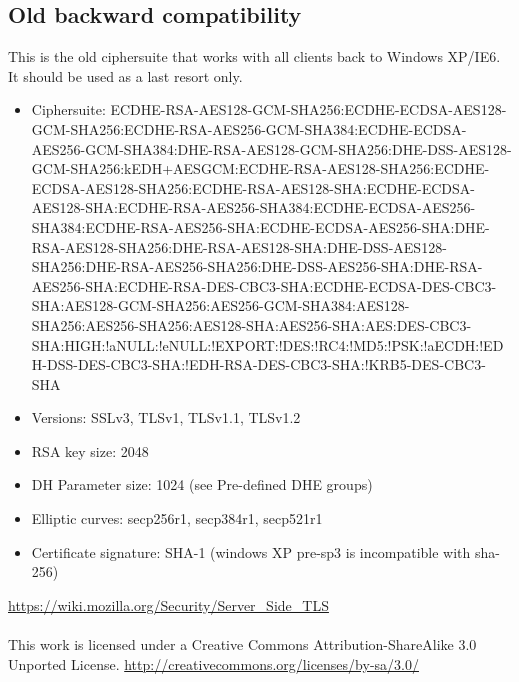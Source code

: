 \subsection{Old backward compatibility}
This is the old ciphersuite that works with all clients back to Windows XP/IE6. It should be used as a last resort only.
\begin{itemize}
\item Ciphersuite: ECDHE-RSA-AES128-GCM-SHA256:ECDHE-ECDSA-AES128-GCM-SHA256:ECDHE-RSA-AES256-GCM-SHA384:ECDHE-ECDSA-AES256-GCM-SHA384:DHE-RSA-AES128-GCM-SHA256:DHE-DSS-AES128-GCM-SHA256:kEDH+AESGCM:ECDHE-RSA-AES128-SHA256:ECDHE-ECDSA-AES128-SHA256:ECDHE-RSA-AES128-SHA:ECDHE-ECDSA-AES128-SHA:ECDHE-RSA-AES256-SHA384:ECDHE-ECDSA-AES256-SHA384:ECDHE-RSA-AES256-SHA:ECDHE-ECDSA-AES256-SHA:DHE-RSA-AES128-SHA256:DHE-RSA-AES128-SHA:DHE-DSS-AES128-SHA256:DHE-RSA-AES256-SHA256:DHE-DSS-AES256-SHA:DHE-RSA-AES256-SHA:ECDHE-RSA-DES-CBC3-SHA:ECDHE-ECDSA-DES-CBC3-SHA:AES128-GCM-SHA256:AES256-GCM-SHA384:AES128-SHA256:AES256-SHA256:AES128-SHA:AES256-SHA:AES:DES-CBC3-SHA:HIGH:!aNULL:!eNULL:!EXPORT:!DES:!RC4:!MD5:!PSK:!aECDH:!EDH-DSS-DES-CBC3-SHA:!EDH-RSA-DES-CBC3-SHA:!KRB5-DES-CBC3-SHA
\item Versions: SSLv3, TLSv1, TLSv1.1, TLSv1.2
\item RSA key size: 2048
\item DH Parameter size: 1024 (see Pre-defined DHE groups)
\item Elliptic curves: secp256r1, secp384r1, secp521r1
\item Certificate signature: SHA-1 (windows XP pre-sp3 is incompatible with sha-256)
\end{itemize}
\url{https://wiki.mozilla.org/Security/Server_Side_TLS}\\\\This work is licensed under a Creative Commons Attribution-ShareAlike 3.0 Unported License. \url{http://creativecommons.org/licenses/by-sa/3.0/}
